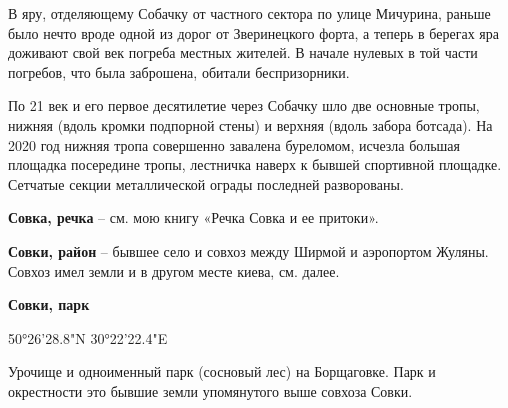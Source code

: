 В яру, отделяющему Собачку от частного сектора по улице Мичурина, раньше было нечто вроде одной из дорог от Зверинецкого форта, а теперь в берегах яра доживают свой век погреба местных жителей. В начале нулевых в той части погребов, что была заброшена, обитали беспризорники.

По 21 век и его первое десятилетие через Собачку шло две основные тропы, нижняя (вдоль кромки подпорной стены) и верхняя (вдоль забора ботсада). На 2020 год нижняя тропа совершенно завалена буреломом, исчезла большая площадка посередине тропы, лестничка наверх к бывшей спортивной площадке. Сетчатые секции металлической ограды последней разворованы.\\

\medskip

\textbf{Совка, речка} – см. мою книгу «Речка Совка и ее притоки».\\

\medskip

\textbf{Совки, район} – бывшее село и совхоз между Ширмой и аэропортом Жуляны. Совхоз имел земли и в другом месте киева, см. далее.\\

\medskip

\textbf{Совки, парк}

50°26'28.8"N 30°22'22.4"E

Урочище и одноименный парк (сосновый лес) на Борщаговке. Парк и окрестности это бывшие земли упомянутого выше совхоза Совки.

\medskip





